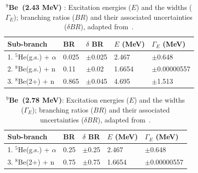 \documentclass{JINST}
\newcommand{\beNINE}{$^{9}$Be~}
\begin{document}
\begin{table}[tb]

\caption{\label{tab} {\bf \beNINE (2.43 MeV) }: Excitation energies ($E$)
and the widths ($\Gamma_E$); branching ratios ($BR$) and their associated
uncertainties ($\delta BR $), adapted from~\cite{PhysRevC.75.045803}.}

\begin{center}
\begin{small}
\begin{tabular}{l l l l l}
\hline
\hline
Sub-branch & BR & $\delta$ BR & $E$ (MeV) &
$\Gamma_E$ (MeV) \\
\hline
1. $^{5}$He(g.s.) + $\alpha$ & 0.025 & $\pm$0.025 & 2.467 & $\pm$0.648 \\ 
2. $^{8}$Be(g.s.) + n & 0.11 & $\pm$0.02 & 1.6654 & $\pm$0.00000557 \\
3. $^{8}$Be(2+) + n  & 0.865 & $\pm$0.045 & 4.695 & $\pm$1.513 \\
\hline
\hline
\end{tabular}
\end{small}
\end{center}
\end{table}



\begin{table}[tb]
\caption{\label{tab2} {\bf \beNINE (2.78 MeV)}: Excitation energies ($E$) and the widths ($\Gamma_E$); branching ratios ($BR$) and their associated uncertainties
($\delta BR $), adapted from~\cite{Prezado200543}.}
\begin{center}
\begin{small}
\begin{tabular}{l l l l l}
\hline
\hline
Sub-branch & BR & $\delta$ BR & $E$ (MeV) &
$\Gamma_E$ (MeV) \\
\hline
1. $^{5}$He(g.s.) + $\alpha$ & 0.25 & $\pm$0.25 & 2.467 & $\pm$0.648 \\ 
3. $^{8}$Be(2+) + n & 0.75 & $\pm$0.75 & 1.6654 & $\pm$0.00000557 \\

\hline
\hline
\end{tabular}
\end{small}
\end{center}
\label{tab2}
\end{table}
\end{document}
